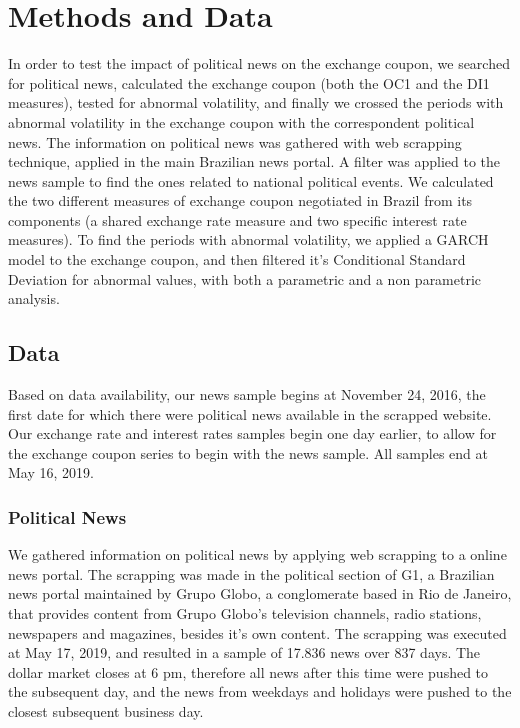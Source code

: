 \documentclass[cic,tc, english]{iiufrgs}
\begin{document}
\chapter{Methods and Data} \label{chapter_methods_data}

    In order to test the impact of political news on the exchange coupon, we searched for political news, calculated the exchange coupon (both the OC1 and the DI1 measures), tested for abnormal volatility, and finally we crossed the periods with abnormal volatility in the exchange coupon with the correspondent political news. The information on political news was gathered with web scrapping technique, applied in the main Brazilian news portal. A filter was applied to the news sample to find the ones related to national political events. We calculated the two different measures of exchange coupon negotiated in Brazil from its components (a shared exchange rate measure and two specific interest rate measures). To find the periods with abnormal volatility, we applied a GARCH model to the exchange coupon, and then filtered it's Conditional Standard Deviation for abnormal values, with both a parametric and a non parametric analysis.

\section{Data} \label{chapter_data}

    Based on data availability, our news sample begins at November 24, 2016, the first date for which there were political news available in the scrapped website. Our exchange rate and interest rates samples begin one day earlier, to allow for the exchange coupon series to begin with the news sample. All samples end at May 16, 2019.

\subsection{Political News} \label{chapter_political_news}
    
    We gathered information on political news by applying web scrapping to a online news portal. The scrapping was made in the political section of G1, a Brazilian news portal maintained by Grupo Globo, a conglomerate based in Rio de Janeiro, that provides content from Grupo Globo's television channels, radio stations, newspapers and magazines, besides it's own content. The scrapping was executed at May 17, 2019, and resulted in a sample of 17.836 news over 837 days. The dollar market closes at 6 pm, therefore all news after this time were pushed to the subsequent day, and the news from weekdays and holidays were pushed to the closest subsequent business day.
\end{document}
